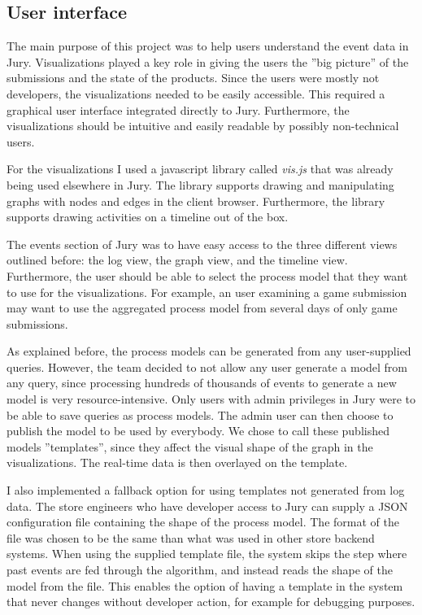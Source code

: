 \subsection{User interface}

The main purpose of this project was to help users understand the event data in Jury.
Visualizations played a key role in giving the users the ''big picture'' of the submissions and the state of the products.
Since the users were mostly not developers, the visualizations needed to be easily accessible.
This required a graphical user interface integrated directly to Jury.
Furthermore, the visualizations should be intuitive and easily readable by possibly non-technical users.

For the visualizations I used a javascript library called \emph{vis.js}  that was already being used elsewhere in Jury.
The library supports drawing and manipulating graphs with nodes and edges in the client browser.
Furthermore, the library supports drawing activities on a timeline out of the box.


The events section of Jury was to have easy access to the three different views outlined before: the log view, the graph view, and the timeline view. Furthermore, the user should be able to select the process model that they want to use for the visualizations.
For example, an user examining a game submission may want to use the aggregated process model from several days of only game submissions.

As explained before, the process models can be generated from any user-supplied queries.
However, the team decided to not allow any user generate a model from any query, since processing hundreds of thousands of events to generate a new model is very resource-intensive.
Only users with admin privileges in Jury were to be able to save queries as process models.
The admin user can then choose to publish the model to be used by everybody.
We chose to call these published models ''templates'', since they affect the visual shape of the graph in the visualizations.
The real-time data is then overlayed on the template.

I also implemented a fallback option for using templates not generated from log data. The store engineers who have developer access to Jury can supply a JSON configuration file containing the shape of the process model. The format of the file was chosen to be the same than what was used in other store backend systems. 
When using the supplied template file, the system skips the step where past events are fed through the algorithm, and instead reads the shape of the model from the file.  
This enables the option of having a template in the system that never changes without developer action, for example for debugging purposes.

